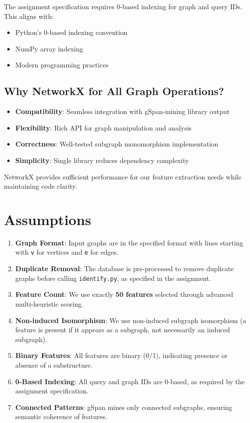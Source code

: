 \documentclass[12pt,a4paper]{article}
\begin{document}
The assignment specification requires 0-based indexing for graph and query IDs. This aligns with:
\begin{itemize}
    \item Python's 0-based indexing convention
    \item NumPy array indexing
    \item Modern programming practices
\end{itemize}

\subsection{Why NetworkX for All Graph Operations?}

\begin{itemize}
    \item \textbf{Compatibility}: Seamless integration with gSpan-mining library output
    \item \textbf{Flexibility}: Rich API for graph manipulation and analysis
    \item \textbf{Correctness}: Well-tested subgraph monomorphism implementation
    \item \textbf{Simplicity}: Single library reduces dependency complexity
\end{itemize}

NetworkX provides sufficient performance for our feature extraction needs while maintaining code clarity.

\section{Assumptions}

\begin{enumerate}
    \item \textbf{Graph Format}: Input graphs are in the specified format with lines starting with \texttt{v} for vertices and \texttt{e} for edges.
    \item \textbf{Duplicate Removal}: The database is pre-processed to remove duplicate graphs before calling \texttt{identify.py}, as specified in the assignment.
    \item \textbf{Feature Count}: We use exactly \textbf{50 features} selected through advanced multi-heuristic scoring.
    \item \textbf{Non-induced Isomorphism}: We use non-induced subgraph isomorphism (a feature is present if it appears as a subgraph, not necessarily an induced subgraph).
    \item \textbf{Binary Features}: All features are binary (0/1), indicating presence or absence of a substructure.
    \item \textbf{0-Based Indexing}: All query and graph IDs are 0-based, as required by the assignment specification.
    \item \textbf{Connected Patterns}: gSpan mines only connected subgraphs, ensuring semantic coherence of features.
\end{enumerate}
\end{document}
